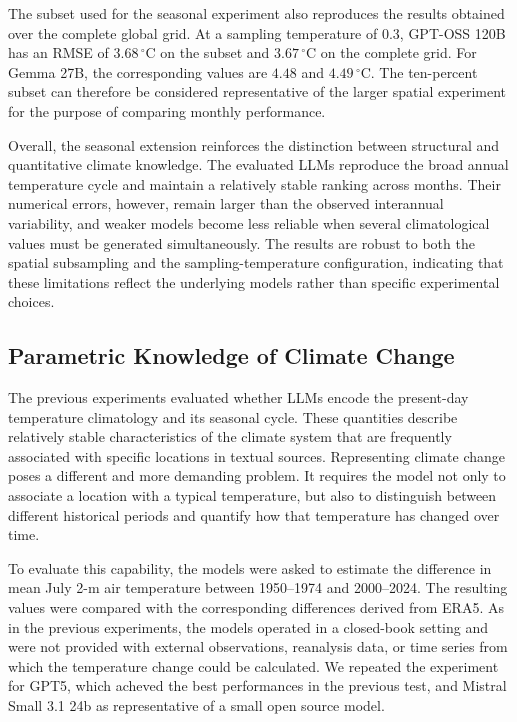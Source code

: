 The subset used for the seasonal experiment also reproduces the results obtained over the complete global grid. At a sampling temperature of 0.3, GPT-OSS 120B has an RMSE of \(3.68\,^{\circ}\mathrm{C}\) on the subset and \(3.67\,^{\circ}\mathrm{C}\) on the complete grid. For Gemma 27B, the corresponding values are \(4.48\) and \(4.49\,^{\circ}\mathrm{C}\). The ten-percent subset can therefore be considered representative of the larger spatial experiment for the purpose of comparing monthly performance.

Overall, the seasonal extension reinforces the distinction between structural and quantitative climate knowledge. The evaluated LLMs reproduce the broad annual temperature cycle and maintain a relatively stable ranking across months. Their numerical errors, however, remain larger than the observed interannual variability, and weaker models become less reliable when several climatological values must be generated simultaneously. The results are robust to both the spatial subsampling and the sampling-temperature configuration, indicating that these limitations reflect the underlying models rather than specific experimental choices.




\subsection{Parametric Knowledge of Climate Change}

The previous experiments evaluated whether LLMs encode the present-day temperature climatology and its seasonal cycle. These quantities describe relatively stable characteristics of the climate system that are frequently associated with specific locations in textual sources. Representing climate change poses a different and more demanding problem. It requires the model not only to associate a location with a typical temperature, but also to distinguish between different historical periods and quantify how that temperature has changed over time.

To evaluate this capability, the models were asked to estimate the difference in mean July 2-m air temperature between 1950--1974 and 2000--2024. The resulting values were compared with the corresponding differences derived from ERA5. As in the previous experiments, the models operated in a closed-book setting and were not provided with external observations, reanalysis data, or time series from which the temperature change could be calculated. We repeated the experiment for GPT5, which acheved the best performances in the previous test, and Mistral Small 3.1 24b as representative of a small open source model.

